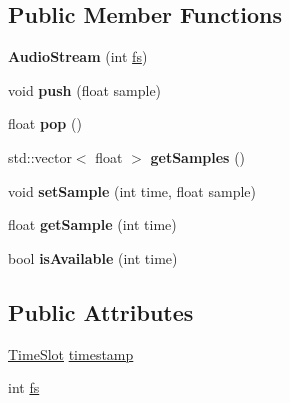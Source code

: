 \subsection*{Public Member Functions}
\begin{DoxyCompactItemize}
\item 
\mbox{\label{class_audio_stream_aea68e011ea0d4cf15a527492155a77c1}} 
{\bfseries Audio\+Stream} (int \hyperlink{class_audio_stream_ace8ac0e7fbaa176c74804b7133c03f45}{fs})
\item 
\mbox{\label{class_audio_stream_ab2ceba569c33b8b5babc7294a2a42a83}} 
void {\bfseries push} (float sample)
\item 
\mbox{\label{class_audio_stream_ab425433b7209483b2fb6c347a78483b5}} 
float {\bfseries pop} ()
\item 
\mbox{\label{class_audio_stream_ae540add8cdf33421e2e3f9014cfa8c52}} 
std\+::vector$<$ float $>$ {\bfseries get\+Samples} ()
\item 
\mbox{\label{class_audio_stream_a5ac03049345307942841bdfcdb75a7e8}} 
void {\bfseries set\+Sample} (int time, float sample)
\item 
\mbox{\label{class_audio_stream_a34fa6ead0ccde4cbe9db7435b3c1fe7a}} 
float {\bfseries get\+Sample} (int time)
\item 
\mbox{\label{class_audio_stream_ac129ca09a55aaeb905bb73ff9440b8ae}} 
bool {\bfseries is\+Available} (int time)
\end{DoxyCompactItemize}
\subsection*{Public Attributes}
\begin{DoxyCompactItemize}
\item 
\hyperlink{struct_audio_stream_1_1_time_slot}{Time\+Slot} \hyperlink{class_audio_stream_aeee7107c25a1ab45b8076e422864a518}{timestamp}
\item 
int \hyperlink{class_audio_stream_ace8ac0e7fbaa176c74804b7133c03f45}{fs}
\end{DoxyCompactItemize}


